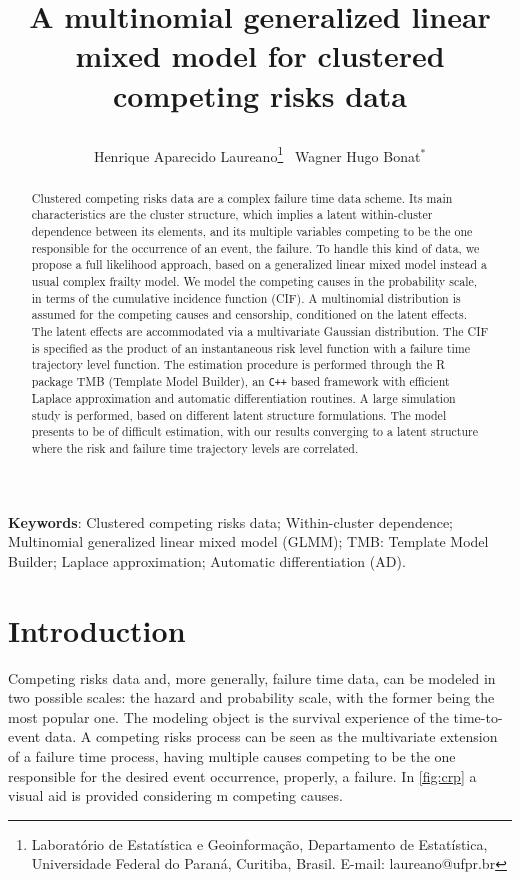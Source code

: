 \documentclass[a4paper,12pt]{article}
\title{
  
  A multinomial generalized linear mixed model for clustered competing
  risks data

}
\author{
  Henrique Aparecido Laureano\thanks{
    Laborat\'{o}rio de Estat\'{i}stica e Geoinforma\c{c}\~{a}o,
    Departamento de Estat\'{i}stica,
    Universidade Federal do Paran\'{a}, Curitiba, Brasil.
    E-mail: laureano@ufpr.br
  }~
  Wagner Hugo Bonat$^\ast$}
\begin{document}
\maketitle

\begin{abstract}

  Clustered competing risks data are a complex failure time data
  scheme. Its main characteristics are the cluster structure, which
  implies a latent within-cluster dependence between its elements, and
  its multiple variables competing to be the one responsible for the
  occurrence of an event, the failure. To handle this kind of data, we
  propose a full likelihood approach, based on a generalized linear
  mixed model instead a usual complex frailty model. We model the
  competing causes in the probability scale, in terms of the cumulative
  incidence function (CIF). A multinomial distribution is assumed for
  the competing causes and censorship, conditioned on the latent
  effects. The latent effects are accommodated via a multivariate
  Gaussian distribution. The CIF is specified as the product of an
  instantaneous risk level function with a failure time trajectory level
  function. The estimation procedure is performed through the R package
  TMB (Template Model Builder), an \texttt{C++} based framework with
  efficient Laplace approximation and automatic differentiation
  routines. A large simulation study is performed, based on different
  latent structure formulations. The model presents to be of difficult
  estimation, with our results converging to a latent structure where
  the risk and failure time trajectory levels are correlated.

\end{abstract}
\vfill
\noindent\textbf{Keywords}: 
Clustered competing risks data;
Within-cluster dependence;
Multinomial generalized linear mixed model (GLMM);
TMB: Template Model Builder;
Laplace approximation;
Automatic differentiation (AD).
\vspace{0.2cm}
\newpage

\section{Introduction}

Competing risks data and, more generally, failure time data, can be modeled in two possible scales: the hazard and probability scale, with the former being the most popular one. The modeling object is the survival experience of the time-to-event data. A competing risks process can be seen as the multivariate extension of a failure time process, having multiple causes competing to be the one responsible for the desired event occurrence, properly, a failure. In \autoref{fig:crp} a visual aid is provided considering m competing causes.
\end{document}
